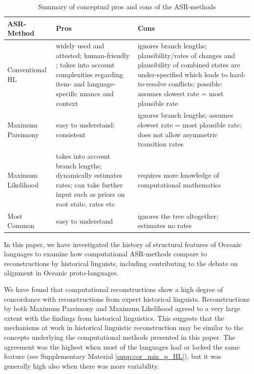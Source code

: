 \documentclass[12pt,letterpaper]{article}
\begin{document}
\begin{table}[ht]
\centering
\caption{Summary of conceptual pros and cons of the ASR-methods}
\label{methods_pros_cpns}
\begin{tabular}{m{4.5cm}m{5cm}m{5cm}}
  \toprule
\textbf{ASR-Method} & \textbf{Pros} & \textbf{Cons} \\ \midrule
Conventional HL &  widely used and attested; human-friendly ; takes into account complexities regarding item- and language-specific nuance and context &  ignores branch lengths; plausibility/rates of changes and plausibility of combined states are under-specified which leads to hard-to-resolve conflicts; possible: assumes slowest rate = most plausible rate\\ \midrule
Maximum Parsimony &  easy to understand; consistent & ignores branch lengths; assumes slowest rate = most plausible rate; does not allow asymmetric transition rates\\ \midrule
Maximum Likelihood & takes into account branch lengths; dynamically estimates rates; can take further input such as priors on root state, rates etc & requires more knowledge of computational mathematics \\ \midrule
Most Common & easy to understand & ignores the tree altogether; estimates no rates  \\
\bottomrule
\end{tabular}
\end{table}



In this paper, we have investigated the history of structural features of Oceanic languages to examine how computational ASR-methods compare to reconstructions by historical linguists, including contributing to the debate on  alignment in Oceanic proto-languages.

We have found that computational reconstructions show a high degree of concordance with reconstructions from expert historical linguists. Reconstructions by both Maximum Parsimony and Maximum Likelihood agreed to a very large extent with the findings from historical linguistics. This suggests that the mechanisms at work in historical linguistic reconstruction may be similar to the concepts underlying the computational methods presented in this paper. The agreement was the highest when most of the languages had or lacked the same feature (see Supplementary Material \ref{supp:cor_min_p_HL}), but it was generally high also when there was more variability.
\end{document}
